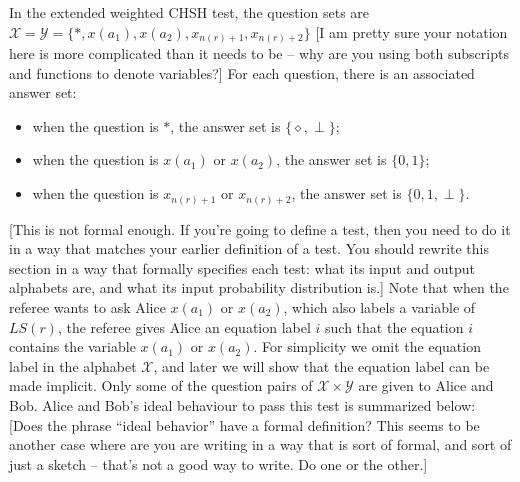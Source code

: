 \documentclass[11pt,letterpaper]{article}
\newcommand{\calX}{\mathcal{X}}
\newcommand{\calY}{\mathcal{Y}}
\newcommand{\1}{\mathbb{1}}
\newcommand{\LS}{LS}
\newcommand{\nr}{n(r)}
\def\carl#1{{\color{blue} #1}}
\theoremstyle{definition}
\begin{document}
In the extended weighted CHSH test,
the question sets are $\calX = \calY = \{\ast, x(a_1), x(a_2), x_{\nr+1}, x_{\nr+2}\}$
\carl{[I am pretty sure your notation here is more complicated than it needs to be -- why are you using both subscripts and functions to denote variables?]}
For each question, there is an associated answer set:
\begin{itemize}
	\item when the question is $\ast$, the answer set is $\{\diamond, \perp\}$;
	\item when the question is $x(a_1)$ or $x(a_2)$, the answer set is $\{0,1\}$;
	\item when the question is $x_{\nr+1}$ or $x_{\nr+2}$, the answer set is $\{0, 1, \perp\}$.
\end{itemize}
\carl{[This is not formal enough.  If you're going to define a test, then you need to do it in a way that matches your earlier definition of a test.  You should rewrite this section in a way that formally specifies each test: what its input and output alphabets are, and what its input probability distribution is.]}
Note that when the referee wants to ask Alice $x(a_1)$ or $x(a_2)$, which also labels a variable of $\LS(r)$, 
the referee gives Alice an equation label $i$ such that  
the equation $i$ contains the variable $x(a_1)$ or $x(a_2)$. 
For simplicity we omit the equation label in the alphabet $\calX$, and
later we will show that the equation label can be made implicit.
Only some of the question pairs of $\calX \times \calY$ are given to Alice and Bob.
Alice and Bob's ideal behaviour to pass this test is summarized 
below:
\carl{[Does the phrase ``ideal behavior'' have a formal definition? This seems to be another case where are you are writing in a way that is sort of formal, and sort of just a sketch -- that's not a good way to write.  Do one or the other.]}
\end{document}
